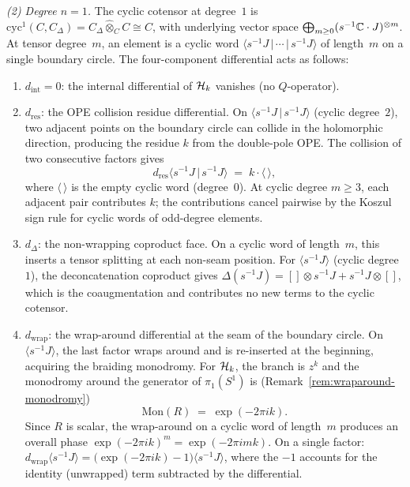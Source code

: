 \begin{computation}
\smallskip
\noindent
\emph{(2) Degree $n=1$.}
The cyclic cotensor at degree~$1$ is
$\mathrm{cyc}^1(C,C_\Delta) = C_\Delta \widehat\otimes_C C
\cong C$,
with underlying vector space
$\bigoplus_{m \ge 0} (s^{-1}\mathbb{C}\cdot J)^{\otimes m}$.
At tensor degree~$m$, an element is a cyclic word
$\langle s^{-1}J\,|\,\cdots\,|\,s^{-1}J\rangle$
of length~$m$ on a single boundary circle.
The four-component differential acts as follows:
\begin{enumerate}[label=\textup{(\alph*)}]
\item $d_{\mathrm{int}} = 0$:
 the internal differential of $\mathcal{H}_k$ vanishes
 (no $Q$-operator).
\item $d_{\mathrm{res}}$: the OPE collision residue
 differential. On $\langle s^{-1}J\,|\,s^{-1}J\rangle$
 (cyclic degree~$2$), two adjacent points on the
 boundary circle can collide in the holomorphic
 direction, producing the residue $k$ from the
 double-pole OPE\@. The collision of two consecutive
 factors gives
 \[
 d_{\mathrm{res}}\langle s^{-1}J\,|\,s^{-1}J\rangle
 \;=\; k \cdot \langle\,\rangle,
 \]
 where $\langle\,\rangle$ is the empty cyclic word
 (degree~$0$). At cyclic degree $m \ge 3$, each adjacent
 pair contributes $k$; the contributions cancel pairwise
 by the Koszul sign rule for cyclic words of odd-degree
 elements.
\item $d_\Delta$: the non-wrapping coproduct face.
 On a cyclic word of length~$m$, this inserts a tensor
 splitting at each non-seam position. For
 $\langle s^{-1}J \rangle$ (cyclic degree~$1$), the
 deconcatenation coproduct gives
 $\Delta(s^{-1}J) = [] \otimes s^{-1}J + s^{-1}J \otimes []$,
 which is the coaugmentation and contributes no new terms
 to the cyclic cotensor.
\item $d_{\mathrm{wrap}}$: the wrap-around differential
 at the seam of the boundary circle. On
 $\langle s^{-1}J \rangle$, the last factor wraps
 around and is re-inserted at the beginning,
 acquiring the braiding monodromy. For $\mathcal{H}_k$,
 the branch is $z^k$ and the monodromy around
 the generator of $\pi_1(S^1)$ is
 (Remark~\ref{rem:wraparound-monodromy})
 \begin{equation}\label{eq:heisenberg-wrap-monodromy}
 \mathrm{Mon}(R) \;=\; \exp(-2\pi i k).
 \end{equation}
 Since $R$ is scalar, the wrap-around on a cyclic word
 of length~$m$ produces an overall phase
 $\exp(-2\pi i k)^m = \exp(-2\pi i m k)$.
 On a single factor:
 $d_{\mathrm{wrap}}\langle s^{-1}J \rangle
 = \bigl(\exp(-2\pi i k) - 1\bigr)\langle s^{-1}J \rangle$,
 where the $-1$ accounts for the identity (unwrapped)
 term subtracted by the differential.
\end{enumerate}


\end{computation}
